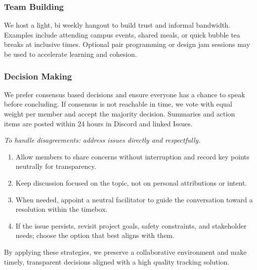 \documentclass{article}
\begin{document}
\subsubsection*{\color{blue}Team Building}

We host a light, bi weekly hangout to build trust and informal bandwidth.
Examples include attending campus events, shared meals, or quick bubble tea
breaks at inclusive times. Optional pair programming or design jam sessions may
be used to accelerate learning and cohesion.

\subsubsection*{\color{blue}Decision Making}

We prefer consensus based decisions and ensure everyone has a chance to speak
before concluding. If consensus is not reachable in time, we vote with equal
weight per member and accept the majority decision. Summaries and action items
are posted within 24 hours in Discord and linked Issues.

\vspace{10pt}
\textit{To handle disagreements: address issues directly and respectfully.}

\begin{enumerate}
  \item Allow members to share concerns without interruption and record key points
        neutrally for transparency.
  \item Keep discussion focused on the topic, not on personal attributions or intent.
  \item When needed, appoint a neutral facilitator to guide the conversation toward a
        resolution within the timebox.
  \item If the issue persists, revisit project goals, safety constraints, and
        stakeholder needs; choose the option that best aligns with them.
\end{enumerate}

By applying these strategies, we preserve a collaborative environment and make
timely, transparent decisions aligned with a high quality tracking solution.
\end{document}
